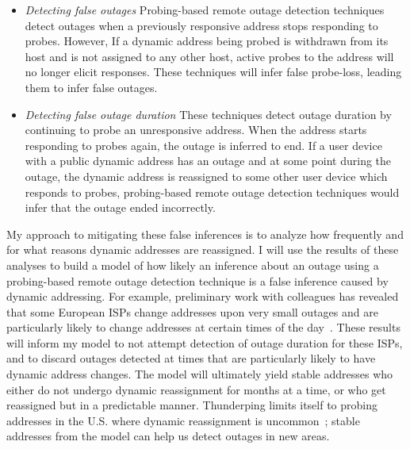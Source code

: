 \begin{itemize}

\item{\emph{Detecting false outages} Probing-based remote outage detection techniques detect outages
    when a previously responsive address stops responding to
    probes. However, If a dynamic address being probed is
withdrawn from its host and is not assigned to any other host, active probes to the address will no longer
elicit responses. These techniques will infer false
probe-loss, leading them to infer false outages.}

\item{\emph{Detecting false outage duration} These techniques detect outage
    duration by continuing to probe an unresponsive address. When the
    address starts responding to probes again, the outage is inferred
    to end. If a user device  with a
    public dynamic address has an outage and at some point during the outage,
    the dynamic address is reassigned to some other user device
    which responds to probes, probing-based remote outage detection techniques would infer that the outage ended incorrectly.
}

\end{itemize}

My approach to mitigating these false inferences is to analyze how
frequently and for what reasons dynamic addresses are
reassigned. I will use the results of these analyses to build a model
of how likely an inference about an outage using a probing-based
remote outage detection technique is
a false inference caused by dynamic addressing. For example,
preliminary work with colleagues has revealed that some European ISPs change addresses upon
very small outages and are particularly likely to change addresses at certain
times of the day~\cite{addrchange-reasons}. These results will inform
my model to not attempt detection of 
outage duration for these ISPs, and to discard outages
detected at times that are particularly likely to have dynamic address
changes. The model will ultimately yield stable addresses who either
do not undergo dynamic reassignment for months at a time, or who get
reassigned but in a predictable manner. Thunderping limits itself to
probing addresses in the U.S. where dynamic reassignment is
uncommon~\cite{addrchange-reasons}; stable addresses from the
model can help us detect outages in new areas.

